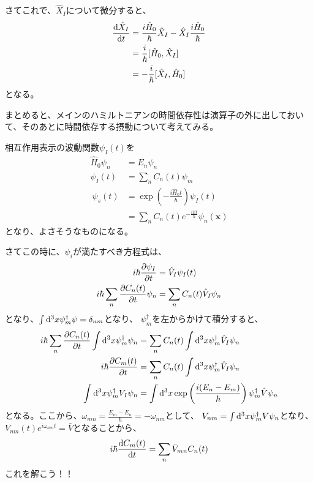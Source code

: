 \documentclass[titlepage]{ltjsarticle}
\begin{document}
さてこれで、\(\hat{X}_I\)について微分すると、
\begin{align}
  \odv{\hat{X}_I}{t} & = \frac{i \hat{H}_0}{\hbar} \hat{X}_I - \hat{X}_I \frac{i \hat{H}_0}{\hbar} \\
  & = \frac{i}{\hbar} [\hat{H}_0,\hat{X}_I]\\
  & = - \frac{i}{\hbar} [\hat{X}_I,\hat{H}_0]
\end{align}
となる。

まとめると、メインのハミルトニアンの時間依存性は演算子の外に出しておいて、そのあとに時間依存する摂動について考えてみる。

相互作用表示の波動関数\(\psi_I(t)\)を
\begin{align}
  \hat{H}_0 \psi_n & = E_n \psi_n \\
  \psi_I(t) & = \sum_n C_n(t) \psi_m\\\
  \psi_s(t) & = \exp \left( - \frac{i \hat{H}_0 t}{\hbar} \right) \psi_I(t) \\
  & = \sum_n C_n(t) e^{-\frac{iEt}{\hbar}} \psi_n(\bm{x})
\end{align}
となり、よさそうなものになる。

さてこの時に、\(\psi_i\)が満たすべき方程式は、
\begin{align}
  i \hbar \pdv{\psi_I}{t} & = \hat{V}_I \psi_I(t) \\
  i \hbar \sum_n \pdv{C_n(t)}{t} \psi_n & = \sum_n C_n(t) \hat{V}_I \psi_n
\end{align}
となり、\(\int \odif[order=3]{x} \psi_m^\dagger \psi = \delta_{nm}\)となり、
\(\psi_m^\dagger\)を左からかけて積分すると、
\begin{align}
  i \hbar \sum_n \pdv{C_n(t)}{t} \int \odif[order=3]{x} \psi_m^\dagger \psi_n & = \sum_n C_n(t) \int \odif[order=3]{x} \psi_m^\dagger \hat{V}_I \psi_n\\
  i \hbar \pdv{C_m(t)}{t} & = \sum_n C_n(t) \int \odif[order=3]{x} \psi_m^\dagger \hat{V}_I \psi_n\\
  \int \odif[order=3]{x} \psi_m^\dagger V_I \psi_n & =\int \odif[order=3]{x} \exp \left( \frac{i(E_n-E_m)}{\hbar} \right)\psi_m^\dagger \hat{V} \psi_n
\end{align}
  となる。ここから、\(\omega_{mn} = \frac{E_m-E_n}{\hbar}=-\omega_{nm}\)として、
  \(V_{nm} = \int \odif[order=3]{x} \psi_{m}^\dagger V \psi_{n}\)となり、\(V_{nm}(t)e^{i \omega_{mn}t} = \bar{V}\)となることから、
  \begin{equation}
    i \hbar \odv{C_m(t)}{t} = \sum_n \bar{V}_{mn} C_n(t)
  \end{equation}
これを解こう！！
\end{document}
